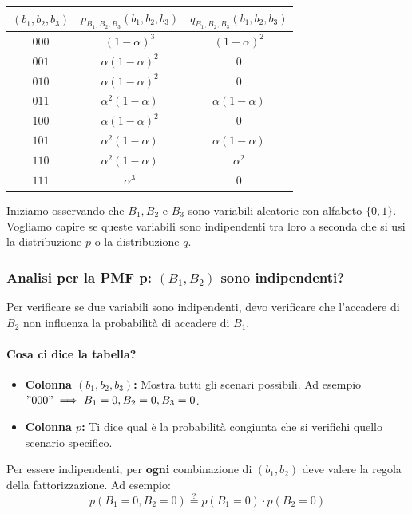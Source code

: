 \begin{table}[h]
    \centering
    \begin{tabular}{|c|c|c|}
        \hline
        $(b_1, b_2, b_3)$ & $p_{B_1,B_2,B_3}(b_1, b_2, b_3)$ & $q_{B_1,B_2,B_3}(b_1, b_2, b_3)$ \\
        \hline
        $000$ & $(1-\alpha)^3$ & $(1-\alpha)^2$ \\
        $001$ & $\alpha(1-\alpha)^2$ & $0$ \\
        $010$ & $\alpha(1-\alpha)^2$ & $0$ \\
        $011$ & $\alpha^2(1-\alpha)$ & $\alpha(1-\alpha)$ \\
        $100$ & $\alpha(1-\alpha)^2$ & $0$ \\
        $101$ & $\alpha^2(1-\alpha)$ & $\alpha(1-\alpha)$ \\
        $110$ & $\alpha^2(1-\alpha)$ & $\alpha^2$ \\
        $111$ & $\alpha^3$ & $0$ \\
        \hline
    \end{tabular}
\end{table}

Iniziamo osservando che $B_1, B_2$ e $B_3$ sono variabili aleatorie con alfabeto $\{0,1\}$. Vogliamo capire se queste variabili sono indipendenti tra loro a seconda che si usi la distribuzione $p$ o la distribuzione $q$.

\subsubsection{Analisi per la PMF p: $(B_1, B_2)$ sono indipendenti?}

Per verificare se due variabili sono indipendenti, devo verificare che l'accadere di $B_2$ non influenza la probabilità di accadere di $B_1$.

\paragraph{Cosa ci dice la tabella?}
\begin{itemize}
    \item \textbf{Colonna $(b_1, b_2, b_3)$:} Mostra tutti gli scenari possibili. Ad esempio $"000" \implies B_1=0, B_2=0, B_3=0$.
    \item \textbf{Colonna $p$:} Ti dice qual è la probabilità congiunta che si verifichi quello scenario specifico.
\end{itemize}

Per essere indipendenti, per \textbf{ogni} combinazione di $(b_1, b_2)$ deve valere la regola della fattorizzazione. Ad esempio:
\[ p(B_1=0, B_2=0) \stackrel{?}{=} p(B_1=0) \cdot p(B_2=0) \]

